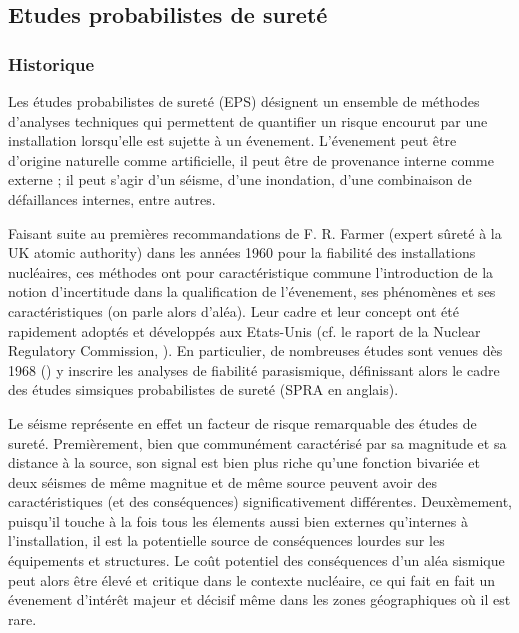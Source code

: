 \subsection{Etudes probabilistes de sureté}
%

\subsubsection{Historique}

Les études probabilistes de sureté (EPS) désignent un ensemble de méthodes d'analyses techniques qui permettent de quantifier un risque encourut par une installation lorsqu'elle est sujette à un évenement. L'évenement peut être d'origine naturelle comme artificielle, il peut être de provenance interne comme externe ; il peut s'agir d'un séisme, d'une inondation, d'une combinaison de défaillances internes, entre autres.  %

Faisant suite au premières recommandations de F. R. Farmer (expert sûreté à la UK atomic authority) dans les années 1960 pour la fiabilité des installations nucléaires,
ces méthodes ont pour caractéristique commune l'introduction de la notion d'incertitude dans la qualification de l'évenement, ses phénomènes et ses caractéristiques (on parle alors d'aléa).
%
%
Leur cadre et leur concept ont été rapidement adoptés et développés aux Etats-Unis (cf. le raport de la Nuclear Regulatory Commission, \cite{nrc_pra_1983}). En particulier, de nombreuses études sont venues dès 1968 (\cite{cornell_engineering_1968}) 
y inscrire les analyses de fiabilité parasismique, définissant alors le cadre des études simsiques probabilistes de sureté (SPRA en anglais). %



Le séisme représente en effet un facteur de risque remarquable des études de sureté.
Premièrement, bien que communément caractérisé par sa magnitude et sa distance à la source, son signal est bien plus riche qu'une fonction bivariée et deux séismes de même magnitue et de même source peuvent avoir des caractéristiques (et des conséquences) significativement différentes.
Deuxèmement, puisqu'il touche à la fois tous les élements aussi bien externes qu'internes à l'installation, il est la potentielle source de conséquences lourdes sur les équipements et structures.
Le coût potentiel des conséquences d'un aléa sismique peut alors être élevé et critique dans le contexte nucléaire, ce qui fait en fait un évenement d'intérêt majeur et décisif même dans les zones géographiques où il est rare.


